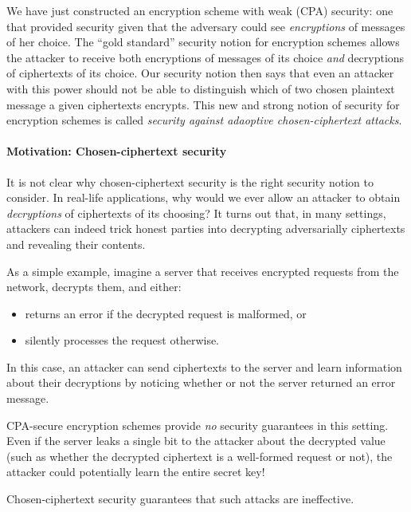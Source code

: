 We have just constructed an encryption scheme with
weak (CPA) security: one that provided security
given that the adversary could see
\emph{encryptions} of messages of her choice.
The ``gold standard'' security notion for encryption
schemes allows the attacker to receive both encryptions
of messages of its choice 
\emph{and} decryptions of ciphertexts of its choice.
Our security notion then says that 
even an attacker with this power should not be
able to distinguish which of two chosen plaintext
message a given ciphertexts encrypts.
This new and strong notion of security for encryption
schemes is called 
\emph{security against adaoptive chosen-ciphertext attacks}.

\paragraph{Motivation: Chosen-ciphertext security}
It is not clear why chosen-ciphertext security is the right 
security notion to consider. 
In real-life applications, why would we ever allow an attacker
to obtain \emph{decryptions} of ciphertexts of its choosing?
It turns out that, in many settings, attackers can indeed
trick honest parties into decrypting adversarially ciphertexts
and revealing their contents.

As a simple example, imagine a server that receives encrypted
requests from the network, decrypts them, and either:
\begin{itemize}
  \item returns an error if the decrypted request is malformed, or
  \item silently processes the request otherwise.
\end{itemize}
In this case, an attacker can send ciphertexts to the server and
learn information about their decryptions by noticing whether or not
the server returned an error message.

CPA-secure encryption schemes provide \emph{no} security guarantees
in this setting. Even if the server leaks a single bit to the attacker 
about the
decrypted value (such as whether the decrypted ciphertext is a
well-formed request or not), the attacker could potentially learn 
the entire secret key!

Chosen-ciphertext security guarantees that such attacks are ineffective.


